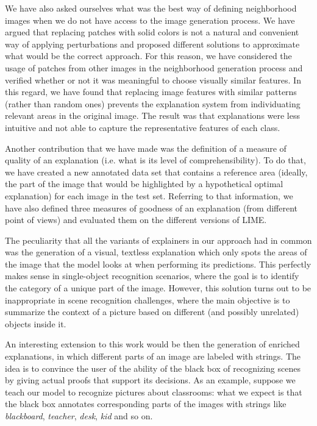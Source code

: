 \documentclass[12pt, twoside, a4paper]{report}
\begin{document}
We have also asked ourselves what was the best way of defining neighborhood images when we do not have access to the image generation process. We have argued that replacing patches with solid colors is not a natural and convenient way of applying perturbations and proposed different solutions to approximate what would be the correct approach. For this reason, we have considered the usage of patches from other images in the neighborhood generation process and verified whether or not it was meaningful to choose visually similar features. In this regard, we have found that replacing image features with similar patterns (rather than random ones) prevents the explanation system from individuating relevant areas in the original image. The result was that explanations were less intuitive and not able to capture the representative features of each class. 

Another contribution that we have made was the definition of a measure of quality of an explanation (i.e. what is its level of comprehensibility). To do that, we have created a new annotated data set that contains a reference area (ideally, the part of the image that would be highlighted by a hypothetical optimal explanation) for each image in the test set. Referring to that information, we have also defined three measures of goodness of an explanation (from different point of views) and evaluated them on the different versions of LIME.

The peculiarity that all the variants of explainers in our approach had in common was the generation of a visual, textless explanation which only spots the areas of the image that the model looks at when performing its predictions. This perfectly makes sense in single-object recognition scenarios, where the goal is to identify the category of a unique part of the image. However, this solution turns out to be inappropriate in scene recognition challenges, where the main objective is to summarize the context of a picture based on different (and possibly unrelated) objects inside it. 

\bigskip

An interesting extension to this work would be then the generation of enriched explanations, in which different parts of an image are labeled with strings. The idea is to convince the user of the ability of the black box of recognizing scenes by giving actual proofs that support its decisions. 
As an example, suppose we teach our model to recognize pictures about classrooms: what we expect is that the black box annotates corresponding parts of the images with strings like \textit{blackboard}, \textit{teacher}, \textit{desk}, \textit{kid} and so on.
\end{document}
